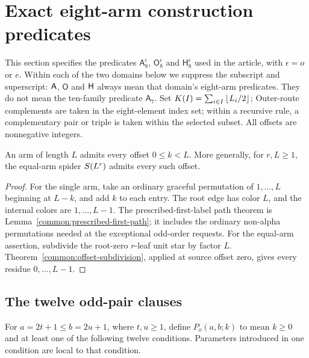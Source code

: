 \section{Exact eight-arm construction predicates}
\label{eight:specification}
This section specifies the predicates $\mathsf A_8^\epsilon$, $\mathsf O_8^\epsilon$ and $\mathsf H_8^\epsilon$ used in the article, with $\epsilon=o$ or $e$. Within each of the two domains below we suppress the subscript and superscript: $\mathsf A$, $\mathsf O$ and $\mathsf H$ always mean that domain's eight-arm predicates. They do not mean the ten-family predicate $\mathsf A_7$. Set $K(I)=\sum_{i\in I}\left\lfloor L_i/2\right\rfloor$; Outer-route complements are taken in the eight-element index set; within a recursive rule, a complementary pair or triple is taken within the selected subset. All offsets are nonnegative integers.

\begin{lemma}\label{eight:single-equal-offsets}
An arm of length $L$ admits every offset $0\le k<L$.  More generally,
for $r,L\ge1$, the equal-arm spider $S\!\left(L^r\right)$ admits every such offset.
\end{lemma}
\begin{proof}
For the single arm, take an ordinary graceful permutation of
$1,\ldots,L$ beginning at $L-k$, and add $k$ to each entry.  The root
edge has color $L$, and the internal colors are $1,\ldots,L-1$.
The prescribed-first-label path theorem is
Lemma~\ref{common:prescribed-first-path}; it includes the ordinary
non-alpha permutations needed at the exceptional odd-order requests.
For the equal-arm assertion, subdivide the root-zero $r$-leaf unit star
by factor $L$.  Theorem~\ref{common:offset-subdivision}, applied at source
offset zero, gives every residue $0,\ldots,L-1$.
\end{proof}

\subsection{The twelve odd-pair clauses}\label{eight:odd-pairs}

For $a=2t+1\le b=2u+1$, where $t,u\ge1$, define $P_o(a,b;k)$ to mean
$k\ge0$ and at least one of the following twelve conditions.  Parameters
introduced in one condition are local to that condition.

